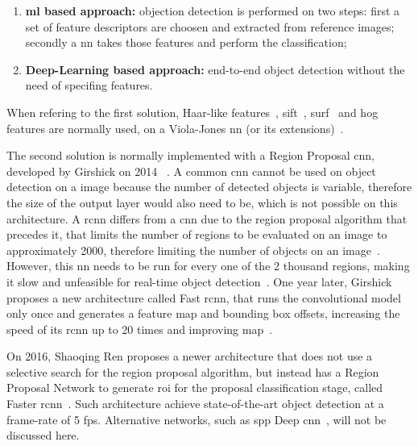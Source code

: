 \begin{enumerate}
	\item \textbf{\acl{ml} based approach:} objection detection is performed on two steps: first a set of feature descriptors are choosen and extracted from reference images; secondly a \acl{nn} takes those features and perform the classification;
	\item \textbf{Deep-Learning based approach:} end-to-end object detection without the need of specifing features.
\end{enumerate}

When refering to the first solution, Haar-like features~\cite{Messom2006}, \ac{sift}~\cite{Hughes2011a}, \ac{surf}~\cite{Bay2008} and \ac{hog}~\cite{Dalal2010, Surasak2018} features are normally used, on a Viola-Jones \ac{nn} (or its extensions)~\cite{Viola2001, ViolaP2004}. %

The second solution is normally implemented with a Region Proposal \acf{cnn}, developed by Girshick on 2014 \etal~\cite{Girshick2014}. A common \ac{cnn} cannot be used on object detection on a image because the number of detected objects is variable, therefore the size of the output layer would also need to be, which is not possible on this architecture. A \ac{rcnn} differs from a \ac{cnn} due to the region proposal algorithm that precedes it, that limits the number of regions to be evaluated on an image to approximately 2000, therefore limiting the number of objects on an image~\cite{Girshick2014}. However, this \acl{nn} needs to be run for every one of the 2 thousand regions, making it slow and unfeasible for real-time object detection~\cite{Girshick2014}. One year later, Girshick proposes a new architecture called Fast \ac{rcnn}, that runs the convolutional model only once and generates a feature map and bounding box offsets, increasing the speed of its \ac{rcnn} up to 20 times and improving \ac{map}~\cite{Girshick2015}. 

On 2016, Shaoqing Ren \etal proposes a newer architecture that does not use a selective search for the region proposal algorithm, but instead has a Region Proposal Network to generate \ac{roi} for the proposal classification stage, called Faster \ac{rcnn}~\cite{Ren2017}. Such architecture achieve state-of-the-art object detection at a frame-rate of 5 \ac{fps}. Alternative networks, such as \ac{spp} Deep \acl{cnn}~\cite{He2015}, will not be discussed here.

